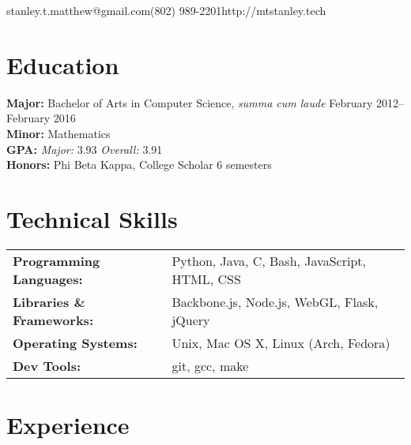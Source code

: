 \documentclass[10pt]{resume}
\begin{document}

\vspace{0.5em}
{stanley.t.matthew@gmail.com}{(802) 989-2201}{http://mtstanley.tech}

\section{Education}

\textbf{Major:} Bachelor of Arts in Computer Science, \textit{summa cum laude} \hfill February 2012--February 2016\\
\textbf{Minor:} Mathematics\\
\textbf{GPA:} \textit{Major:} 3.93 \textit{Overall:} 3.91\\
\textbf{Honors:} Phi Beta Kappa, College Scholar 6 semesters

\section{Technical Skills}
\begin{tabular}{>{\bfseries}l l}
Programming Languages:  &  Python, Java, C, Bash, JavaScript, HTML, CSS \\
Libraries \& Frameworks:&  Backbone.js, Node.js, WebGL, Flask, jQuery   \\
Operating Systems:      &  Unix, Mac OS X, Linux (Arch, Fedora)         \\
Dev Tools:              &  git, gcc, make                               \\
\end{tabular}

\section{Experience}
\end{document}
